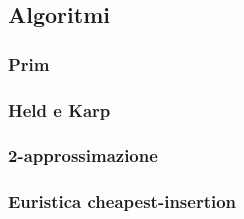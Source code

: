 \documentclass[]{article}
\begin{document}
\subsection{Algoritmi}
\subsubsection{Prim}
\subsubsection{Held e Karp}
\subsubsection{2-approssimazione}
\newpage
\subsubsection{Euristica cheapest-insertion}
\end{document}
